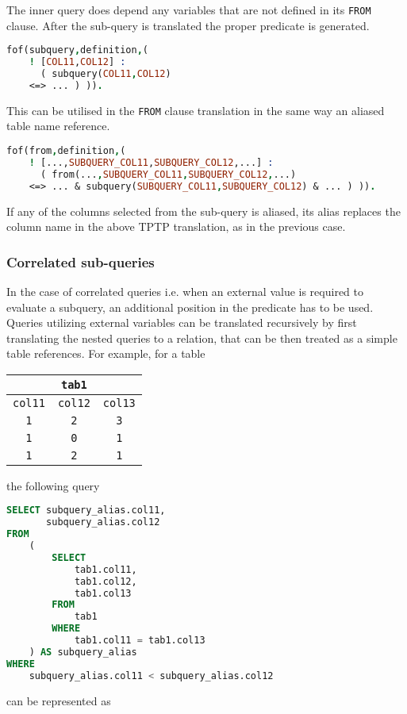 \documentclass[magisterska,en]{pracamgr}
\newcommand{\code}[1]{\texttt{#1}}
\begin{document}
The inner query does depend any variables that are not defined in its \code{FROM} clause. After the sub-query is translated the proper predicate is generated.
\begin{lstlisting}[language=Prolog]
fof(subquery,definition,(
    ! [COL11,COL12] :
      ( subquery(COL11,COL12)
    <=> ... ) )). 
\end{lstlisting}

This can be utilised in the \code{FROM} clause translation in the same way an aliased table name reference.

\begin{lstlisting}[language=Prolog]
fof(from,definition,(
    ! [...,SUBQUERY_COL11,SUBQUERY_COL12,...] :
      ( from(...,SUBQUERY_COL11,SUBQUERY_COL12,...)
    <=> ... & subquery(SUBQUERY_COL11,SUBQUERY_COL12) & ... ) )). 
\end{lstlisting}

If any of the columns selected from the sub-query is aliased, its alias replaces the column name in the above TPTP translation, as in the previous case.

\subsubsection{Correlated sub-queries}
In the case of correlated queries i.e. when an external value is required to evaluate a subquery, an additional position in the predicate has to be used. 
Queries utilizing external variables can be translated recursively by first translating the nested queries to a relation, that can be then treated as a simple table references. For example, for a table

\begin{center}
\begin{tabular}{|c|c|c|}
    \hline
    \multicolumn{3}{|c|}{\code{tab1}} \\
    \hline
    \code{col11} & \code{col12} & \code{col13} \\
    \hline
    \code{1} & \code{2} & \code{3} \\ 
    \code{1} & \code{0} & \code{1} \\ 
    \code{1} & \code{2} & \code{1} \\ 
    \hline
\end{tabular}
\end{center}
the following query

\begin{lstlisting}[language=SQL]
SELECT subquery_alias.col11,
       subquery_alias.col12
FROM
    (
        SELECT
            tab1.col11,
            tab1.col12,
            tab1.col13
        FROM
            tab1
        WHERE
            tab1.col11 = tab1.col13
    ) AS subquery_alias
WHERE
    subquery_alias.col11 < subquery_alias.col12
\end{lstlisting}
can be represented as
\end{document}
